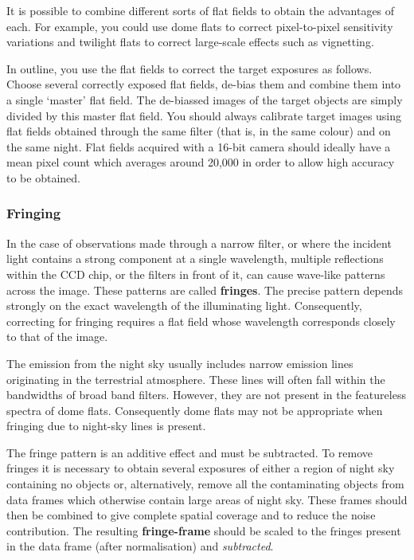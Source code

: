 \documentclass[twoside,11pt]{starlink}
\begin{document}
It is possible to combine different sorts of flat fields to obtain the
advantages of each.  For example, you could use dome flats to correct
pixel-to-pixel sensitivity variations and twilight flats to correct
large-scale effects such as vignetting.

In outline, you use the flat fields to correct the target exposures
as follows.  Choose several correctly exposed flat fields, de-bias
them and combine them into a single `master' flat field.  The de-biassed
images of the target objects are simply divided by this master flat
field.  You should always calibrate target images using flat fields
obtained through the same filter (that is, in the same colour) and on the
same night.  Flat fields acquired with a 16-bit camera should ideally
have a mean pixel count which averages around 20,000 in order to allow
high accuracy to be obtained.

\subsubsection{Fringing}

In the case of observations made through a narrow filter, or where the
incident light contains a strong component at a single wavelength,
multiple reflections within the CCD chip, or the filters in front of it,
can cause wave-like patterns across the image.  These patterns are
called \textbf{fringes}.  The precise pattern depends strongly on the
exact wavelength of the illuminating light.  Consequently, correcting for
fringing requires a flat field whose wavelength corresponds closely to that
of the image.

The emission from the night sky usually includes narrow emission lines
originating in the terrestrial atmosphere.  These lines will often fall
within the bandwidths of broad band filters.  However, they are not present
in the featureless spectra of dome flats.  Consequently dome flats may
not be appropriate when fringing due to night-sky lines is present.

The fringe pattern is an additive effect and must be subtracted. To
remove fringes it is necessary to obtain several exposures of either a
region of night sky containing no objects or, alternatively, remove all
the contaminating objects from data frames which otherwise contain large
areas of night sky.  These frames should then be combined to give complete
spatial coverage and to reduce the noise contribution.  The resulting
\textbf{fringe-frame} should be scaled to the fringes present in the data
frame (after normalisation) and \textit{subtracted}.
\end{document}
